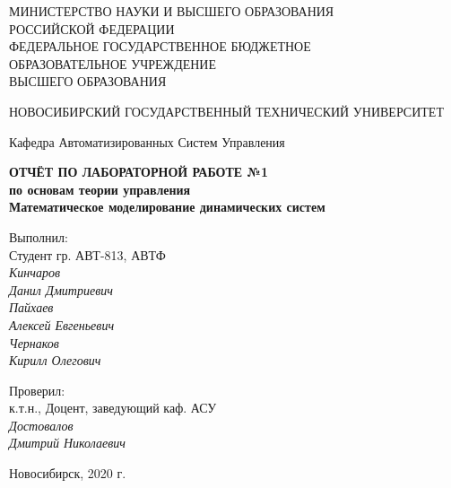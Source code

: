 \documentclass[12pt]{article}
\begin{document}
	
	\begin{titlepage}
		\begin{center}
			\large
			МИНИСТЕРСТВО НАУКИ И ВЫСШЕГО ОБРАЗОВАНИЯ\\ РОССИЙСКОЙ ФЕДЕРАЦИИ \\
			\vspace{0.05cm}
			ФЕДЕРАЛЬНОЕ ГОСУДАРСТВЕННОЕ БЮДЖЕТНОЕ\\ ОБРАЗОВАТЕЛЬНОЕ УЧРЕЖДЕНИЕ \\ ВЫСШЕГО ОБРАЗОВАНИЯ 
			
			\vspace{0.25cm}
			
			НОВОСИБИРСКИЙ ГОСУДАРСТВЕННЫЙ ТЕХНИЧЕСКИЙ УНИВЕРСИТЕТ
			\vspace{0.5cm}
			
			
			Кафедра Автоматизированных Систем Управления
			\vfill
			
			
			\textbf{ОТЧЁТ ПО ЛАБОРАТОРНОЙ РАБОТЕ №1}\\[2mm]
			\textbf{по основам теории управления}\\[2mm]
			\textbf{Математическое моделирование динамических систем}\\[3mm]
			\vspace{0.1cm}
		\end{center}
		\vfill
		\newlength{\ML}
		\hfill\begin{minipage}{0.3\textwidth}
			Выполнил:\\
			Студент гр. АВТ-813, АВТФ \\
			
			{\it Кинчаров} \\
			{\it Данил Дмитриевич}\\
			{\it Пайхаев} \\
			{\it Алексей Евгеньевич} \\
			{\it Чернаков} \\
			{\it Кирилл Олегович}\\
			
		\end{minipage}%
		\bigskip
		
		\hfill\begin{minipage}{0.3\textwidth}
			Проверил:\\
			к.т.н., Доцент, заведующий каф. АСУ \\
			{\it Достовалов} \\
			{\it Дмитрий Николаевич}
		\end{minipage}%
		\vfill
		
		\begin{center}
			Новосибирск, 2020 г.
		\end{center}
	\end{titlepage}  
	\tableofcontents
	\newpage
	
\end{document}

